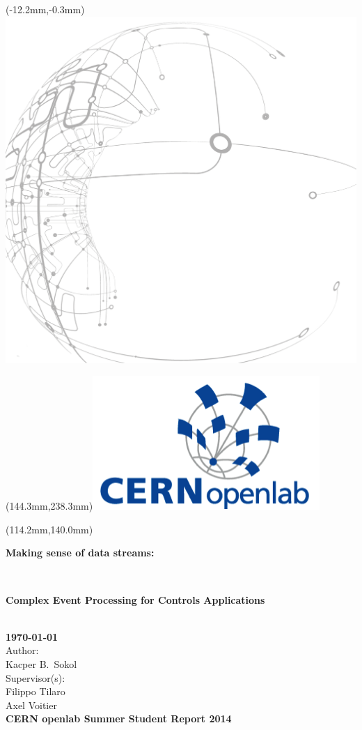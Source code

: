\documentclass[11pt, letterpaper]{article}            %
\begin{document}
\begin{textblock*}{0mm}(-12.2mm,-0.3mm)\noindent \includegraphics*{./gfx/bg.png}\end{textblock*}
\begin{textblock*}{0mm}(144.3mm,238.3mm)\noindent \includegraphics*{./gfx/openlab.png}\end{textblock*}
\begin{textblock*}{150mm}(114.2mm,140.0mm)\noindent
\parbox{8cm}{\bfseries\sffamily\textbf{\fontsize{20}{20}\selectfont\color{natc}Making sense of data streams:}}\\[.3em]
\parbox{8cm}{\bfseries\sffamily\textbf{\fontsize{20}{20}\selectfont\color{natc}Complex Event Processing for Controls Applications}}\\[36pt]
{\bfseries\sffamily\textbf{\fontsize{16}{20}\selectfont\color{natc}\motd\today}}\\[18pt]
{\sffamily\fontsize{14}{20}\selectfont\color{subc}Author:}\\
{\sffamily\fontsize{14}{20}\selectfont\color{subc}Kacper B.\ Sokol}\\[18pt]
{\sffamily\fontsize{14}{20}\selectfont\color{subc}Supervisor(s):}\\
{\sffamily\fontsize{14}{20}\selectfont\color{subc}Filippo Tilaro}\\
{\sffamily\fontsize{14}{20}\selectfont\color{subc}Axel Voitier}\\[18pt]
\textbf{\bfseries\sffamily\fontsize{11}{20}\selectfont\color{subc}CERN openlab Summer Student Report 2014}

\end{textblock*}
\end{document}
